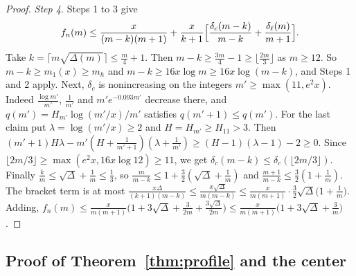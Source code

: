 \begin{proof}
\emph{Step 4.} Steps 1 to 3 give
\[
 f_n(m)\le\frac{x}{(m-k)(m+1)}+\frac x{k+1}\Bigl[\frac{\delta_c(m-k)}{m-k}+\frac{\delta_\ell(m)}{m+1}\Bigr].
\]
Take $k=\lceil m\sqrt{\Delta(m)}\rceil\le\frac m4+1$. Then
$m-k\ge\frac{3m}4-1\ge\lfloor\frac{2m}3\rfloor$ as $m\ge12$. So
$m-k\ge m_1(x)\ge m_h$ and $m-k\ge16x\log m\ge16x\log(m-k)$, and Steps 1
and 2 apply. Next, $\delta_c$ is nonincreasing on the integers
$m'\ge\max(11,e^2x)$. Indeed $\frac{\log m'}{m'}$, $\frac1{m'}$ and
$m'e^{-0.093m'}$ decrease there, and $q(m')=H_{m'}\log(m'/x)/m'$ satisfies
$q(m'+1)\le q(m')$. For the last claim put $\lambda=\log(m'/x)\ge2$ and
$H=H_{m'}\ge H_{11}>3$. Then
$(m'+1)H\lambda-m'(H+\frac1{m'+1})(\lambda+\frac1{m'})\ge(H-1)(\lambda-1)-2\ge0$.
Since $\lfloor2m/3\rfloor\ge\max(e^2x,16x\log12)\ge11$, we get
$\delta_c(m-k)\le\delta_c(\lfloor2m/3\rfloor)$. Finally
$\frac km\le\sqrt\Delta+\frac1m\le\frac13$, so
$\frac m{m-k}\le1+\frac32(\sqrt\Delta+\frac1m)$ and $\frac{m+1}{m-k}\le\frac32(1+\frac1m)$.
The bracket term is at most
$\frac{x\Delta}{(k+1)(m-k)}\le\frac{x\sqrt\Delta}{m(m-k)}\le\frac{x}{m(m+1)}\cdot\frac32\sqrt\Delta\bigl(1+\frac1m\bigr)$.
Adding,
$f_n(m)\le\frac{x}{m(m+1)}\bigl(1+3\sqrt\Delta+\frac3{2m}+\frac{3\sqrt\Delta}{2m}\bigr)\le\frac{x}{m(m+1)}\bigl(1+3\sqrt\Delta+\frac3m\bigr)$.
\end{proof}

\subsection{Proof of \texorpdfstring{Theorem~\ref{thm:profile}}{Theorem 3.9} and the center}\label{app:shape-profile}

